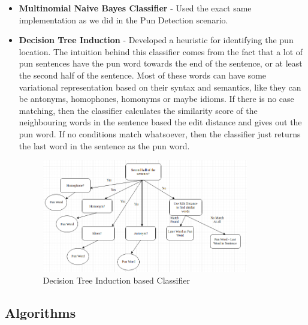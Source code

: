 \documentclass{article}
\begin{document}
\begin{itemize}
    \item \textbf{Multinomial Naive Bayes Classifier} - Used the exact same implementation as we did in the Pun Detection scenario.
    
    \item \textbf{Decision Tree Induction} - Developed a heuristic for identifying the pun location. The intuition behind this classifier comes from the fact that a lot of pun sentences have the pun word towards the end of the sentence, or at least the second half of the sentence. Most of these words can have some variational representation based on their syntax and semantics, like they can be antonyms, homophones, homonyms or maybe idioms. If there is no case matching, then the classifier calculates the similarity score of the neighbouring words in the sentence based the edit distance and gives out the pun word. If no conditions match whatsoever, then the classifier just returns the last word in the sentence as the pun word.

    \begin{figure}[h!]
    \centering
    \includegraphics[width=90mm]{decision_tree.png}
    \caption{Decision Tree Induction based Classifier}
    \label{fig:method}
    \end{figure}

\end{itemize}


\subsection{Algorithms}
\end{document}
